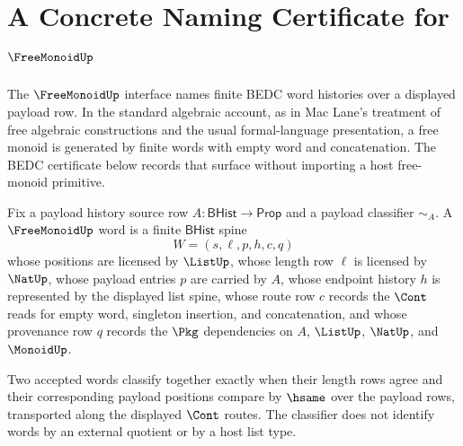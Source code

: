 \chapter{A Concrete Naming Certificate for $\FreeMonoidUp$}
\label{ch:concrete-instances-freemonoid-namecert}

The $\FreeMonoidUp$ interface names finite BEDC word histories over a displayed
payload row. In the standard algebraic account, as in Mac Lane's treatment of
free algebraic constructions and the usual formal-language presentation, a free
monoid is generated by finite words with empty word and concatenation. The BEDC
certificate below records that surface without importing a host free-monoid
primitive.

\begin{definition}
\label{def:freemonoid-word-carrier}
Fix a payload history source row $A:\mathsf{BHist}\to\mathsf{Prop}$ and a
payload classifier $\sim_A$. A $\FreeMonoidUp$ word is a finite
$\mathsf{BHist}$ spine
$$
W=(s,\ell,p,h,c,q)
$$
whose positions are licensed by $\ListUp$, whose length row $\ell$ is licensed
by $\NatUp$, whose payload entries $p$ are carried by $A$, whose endpoint
history $h$ is represented by the displayed list spine, whose route row $c$
records the $\Cont$ reads for empty word, singleton insertion, and
concatenation, and whose provenance row $q$ records the $\Pkg$ dependencies on
$A$, $\ListUp$, $\NatUp$, and $\MonoidUp$.

Two accepted words classify together exactly when their length rows agree and
their corresponding payload positions compare by $\hsame$ over the payload
rows, transported along the displayed $\Cont$ routes. The classifier does not
identify words by an external quotient or by a host list type.
\end{definition}

